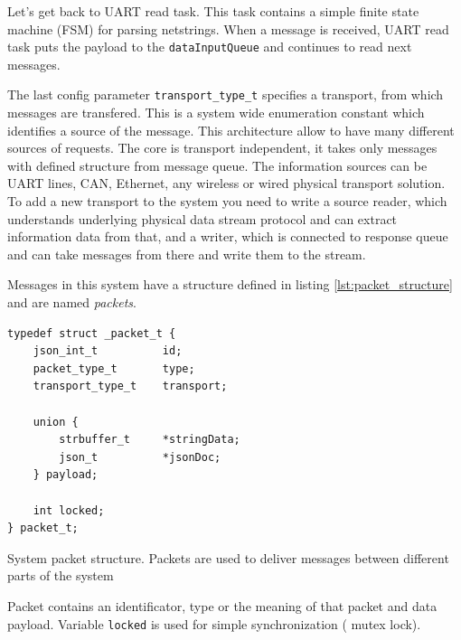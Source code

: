 Let's get back to UART read task. This task contains a simple finite state
machine (FSM) for parsing netstrings. When a message is received, UART read task
puts the payload to the \texttt{dataInputQueue} and continues to read next
messages.

The last config parameter \texttt{transport\_type\_t} specifies a transport,
from which messages are transfered.
This is a system wide enumeration constant which identifies a source of the
message. This architecture allow to have many different sources of requests. The
core is transport independent, it takes only messages with defined structure
from message queue. The information sources can be UART lines, \gls{CAN},
Ethernet, any wireless or wired physical transport solution. 
To add a new transport to the system you need
to write a source reader, which understands underlying physical data stream
protocol and can extract information data from that, and a writer, which is
connected to response queue and can take messages from there and write them to
the stream.

Messages in this system have a structure defined in listing 
\ref{lst:packet_structure} and are named \textit{packets}.

\begin{listing}[H]
\begin{verbatim}
typedef struct _packet_t {
	json_int_t          id;
	packet_type_t       type;
	transport_type_t    transport;
	
	union {
		strbuffer_t		*stringData;
		json_t			*jsonDoc;
	} payload;
	
	int locked;
} packet_t;
\end{verbatim}
\caption{System packet structure. Packets are used to deliver messages between
different parts of the system}
\label{lst:packet_structure}
\end{listing}

Packet contains an identificator, type or the meaning of that packet  and data
payload. Variable \texttt{locked} is used for simple synchronization ( mutex
lock).

